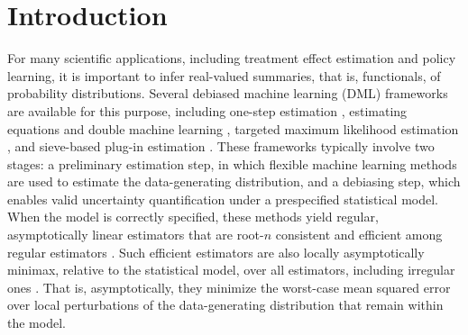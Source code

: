 \documentclass[11pt]{article}
\theoremstyle{definition}
\newcommand{\slightspacing}{\setstretch{1.175}}
\begin{document}
\doublespacing

\slightspacing

\section{Introduction}





For many scientific applications, including treatment effect estimation and policy learning, it is important to infer real-valued summaries, that is, functionals, of probability distributions. Several debiased machine learning (DML) frameworks are available for this purpose, including one-step estimation \citep{levit1975efficiency, pfanzagl1985contributions, hasminskii1979nonparametric, bickel1993efficient}, estimating equations and double machine learning \citep{robins1995analysis, robinsCausal, vanderlaanunified, DoubleML}, targeted maximum likelihood estimation \citep{laan_rubin_2006, vanderLaanRose2011}, and sieve-based plug-in estimation \citep{shen1997methods, spnpsieve, sieveOneStepPlugin, SieveQiu, discussionMLEMark,undersmoothedHAL}. These frameworks typically involve two stages: a preliminary estimation step, in which flexible machine learning methods are used to estimate the data-generating distribution, and a debiasing step, which enables valid uncertainty quantification under a prespecified statistical model. When the model is correctly specified, these methods yield regular, asymptotically linear estimators that are root-\(n\) consistent and efficient among regular estimators \citep{bickel1993efficient, vandervaart2000asymptotic}. Such efficient estimators are also locally asymptotically minimax, relative to the statistical model, over all estimators, including irregular ones \citep{vandervaart2000asymptotic}. That is, asymptotically, they minimize the worst-case mean squared error over local perturbations of the data-generating distribution that remain within the model.

 
 
\end{document}
